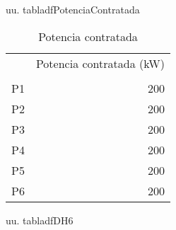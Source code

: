 \documentclass[a4paper,10pt,twocolumn]{article}
\begin{document}
\begin{Form}
uu. tabladfPotenciaContratada


                    \begin{table}[H] \centering
                        {
                        \begin{tabular}{lr}
\toprule
 & Potencia contratada (kW) \\
 &  \\
\midrule
P1 & 200 \\
P2 & 200 \\
P3 & 200 \\
P4 & 200 \\
P5 & 200 \\
P6 & 200 \\
\bottomrule
\end{tabular}

                        }
                        \caption{Potencia contratada}
                    \end{table}
                    

uu. tabladfDH6



\end{Form}
\end{document}
